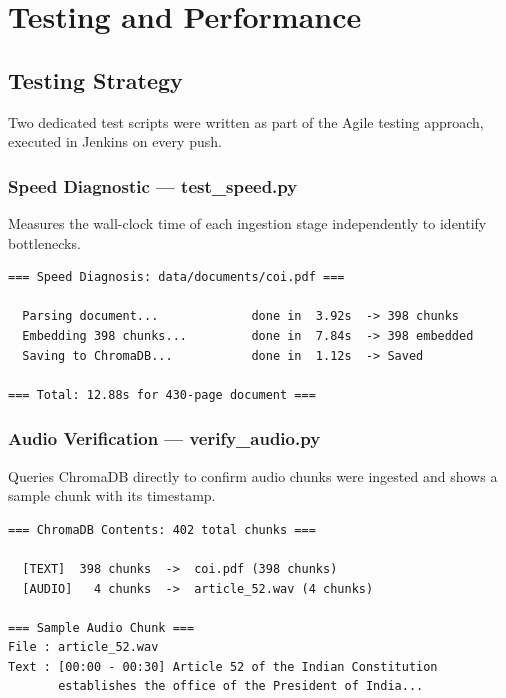 \documentclass[12pt,a4paper]{report}
\begin{document}
\chapter{Testing and Performance}

\section{Testing Strategy}

Two dedicated test scripts were written as part of the Agile testing approach, executed in Jenkins on every push.

\subsection{Speed Diagnostic --- test\_speed.py}

Measures the wall-clock time of each ingestion stage independently to identify bottlenecks.

\begin{lstlisting}[caption=Speed Diagnostic Output --- After Dynamic Chunking Fix]
=== Speed Diagnosis: data/documents/coi.pdf ===

  Parsing document...             done in  3.92s  -> 398 chunks
  Embedding 398 chunks...         done in  7.84s  -> 398 embedded
  Saving to ChromaDB...           done in  1.12s  -> Saved

=== Total: 12.88s for 430-page document ===
\end{lstlisting}

\subsection{Audio Verification --- verify\_audio.py}

Queries ChromaDB directly to confirm audio chunks were ingested and shows a sample chunk with its timestamp.

\begin{lstlisting}[caption=Audio Verification Output]
=== ChromaDB Contents: 402 total chunks ===

  [TEXT]  398 chunks  ->  coi.pdf (398 chunks)
  [AUDIO]   4 chunks  ->  article_52.wav (4 chunks)

=== Sample Audio Chunk ===
File : article_52.wav
Text : [00:00 - 00:30] Article 52 of the Indian Constitution
       establishes the office of the President of India...
\end{lstlisting}
\end{document}
